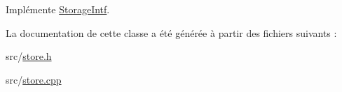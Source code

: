 Implémente \hyperlink{class_storage_intf_a97b26023c6cf0590423e428947d6febb}{Storage\+Intf}.



La documentation de cette classe a été générée à partir des fichiers suivants \+:\begin{DoxyCompactItemize}
\item 
src/\hyperlink{store_8h}{store.\+h}\item 
src/\hyperlink{store_8cpp}{store.\+cpp}\end{DoxyCompactItemize}
